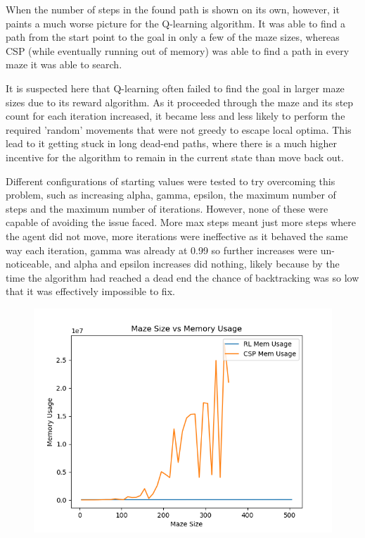 \documentclass{article}
\newcommand\tab[1][1cm]{\hspace*{#1}}
\begin{document}
         \tab When the number of steps in the found path is shown on its own, 
         however, it paints a much worse picture for the Q-learning algorithm. 
         It was able to find a path from the start point to the goal in 
         only a few of the maze sizes, whereas CSP (while eventually 
         running out of memory) was able to find a path in every maze 
         it was able to search.

         \tab It is suspected here that Q-learning often failed to find the goal 
         in larger maze sizes due to its reward algorithm. As it proceeded 
         through the maze and its step count for each iteration increased, 
         it became less and less likely to perform the required 'random' 
         movements that were not greedy to escape local optima. This lead
         to it getting stuck in long dead-end paths, where there is a much 
         higher incentive for the algorithm to remain
         in the current state than move back out.

         \tab Different configurations of starting values were tested to try 
         overcoming this problem, such as increasing alpha, gamma, epsilon, 
         the maximum number of steps and the maximum number of iterations. 
         However, none of these were capable of avoiding the issue faced. 
         More max steps meant just more steps where the agent did not move, more
         iterations were ineffective as it behaved the same way each iteration, 
         gamma was already at 0.99 so further increases were un-noticeable, 
         and alpha and epsilon increases did nothing, likely because by the 
         time the algorithm had reached a dead end the chance of backtracking 
         was so low that it was effectively impossible to fix.

        \begin{figure}[ht]
            \centering
            \includegraphics[scale=0.6]{assets/MemOnly.png}
            \label{MemOnly}
        \end{figure}
\end{document}
